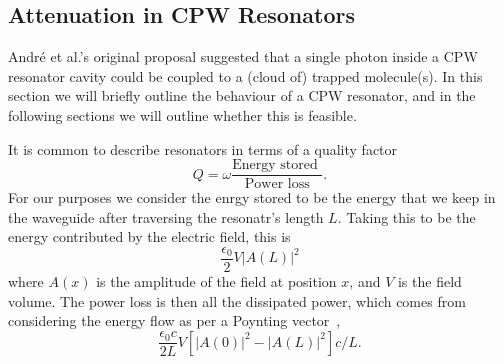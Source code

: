 \subsection{Attenuation in CPW Resonators}

Andr\'e et al.'s  original proposal suggested that a
single photon inside a CPW resonator cavity could be coupled to a (cloud of)
trapped molecule(s). In this section we will briefly outline the behaviour of a
CPW resonator, and in the following sections we will outline whether this is
feasible. %

It is common to describe resonators in terms of a quality
factor~\cite{Jackson1975, 1125652}
\begin{equation}
  Q = \omega \frac{\text{Energy stored }}{\text{Power loss}}.
\end{equation}
For our purposes we consider the enrgy stored to be the energy that we keep in
the waveguide after traversing the resonatr's length $L$. Taking this to be the
energy contributed by the electric field, this is
\begin{equation}
  \frac{\epsilon_0}{2} V \lvert A(L) \rvert^2
\end{equation}
where $A(x)$ is the amplitude of the field at position $x$, and $V$ is the field
volume.  The power loss is then all the dissipated power, which comes from
considering the energy flow as per a Poynting vector~\cite{Jackson1975},
\begin{equation}
  \frac{\epsilon_0 c}{2L}V \left[ \lvert A(0) \rvert^2 - \lvert A(L) \rvert^2
  \right] c/L.
\end{equation}

